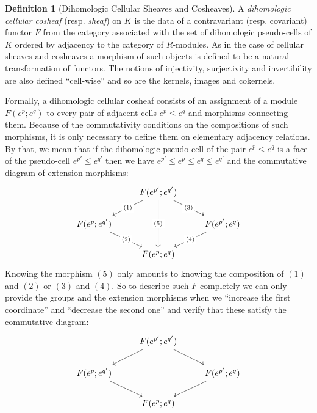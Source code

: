 \documentclass[10pt]{amsart}
\theoremstyle{definition}
\newtheorem{defi}[theo]{Definition}
\numberwithin{equation}{section}
\numberwithin{figure}{section}
\begin{document}
\begin{defi}[Dihomologic Cellular Sheaves and Cosheaves]\label{definition:dih_cosheaves}
A \emph{dihomologic cellular cosheaf} (resp. \emph{sheaf}) on $K$ is the data of a contravariant (resp. covariant) functor $F$ from the category associated with the set of dihomologic pseudo-cells of $K$ ordered by adjacency to the category of $R$-modules. As in the case of cellular sheaves and cosheaves a morphism of such objects is defined to be a natural transformation of functors. The notions of injectivity, surjectivity and invertibility are also defined ``cell-wise'' and so are the kernels, images and cokernels.


Formally, a dihomologic cellular cosheaf consists of an assignment of a module $F(e^p;e^q)$ to every pair of adjacent cells $e^p\leq e^q$ and morphisms connecting them. Because of the commutativity conditions on the compositions of such morphisms, it is only necessary to define them on elementary adjacency relations. By that, we mean that if the dihomologic pseudo-cell of the pair $e^p\leq e^q$ is a face of the pseudo-cell $e^{p'}\leq e^{q'}$ then we have $e^{p'}\leq e^{p}\leq e^{q}\leq e^{q'}$ and the commutative diagram of extension morphisms:
\begin{equation*}
\begin{tikzcd}
& F(e^{p'};e^{q'}) \ar[dd, "(5)" description] \ar[dr,"(3)" description] \ar[dl,"(1)" description] & \\
F(e^{p};e^{q'}) \ar[dr,"(2)" description] & & F(e^{p'};e^{q}) \ar[dl,"(4)" description] \\
& F(e^{p};e^{q}) &
\end{tikzcd}
\end{equation*}
Knowing the morphism $(5)$ only amounts to knowing the composition of $(1)$ and $(2)$ or $(3)$ and $(4)$. So to describe such $F$ completely we can only provide the groups and the extension morphisms when we ``increase the first coordinate'' and ``decrease the second one'' and verify that these satisfy the commutative diagram:
\begin{equation*}
\begin{tikzcd}
& F(e^{p'};e^{q'}) \ar[dr] \ar[dl] & \\
F(e^{p};e^{q'}) \ar[dr] & & F(e^{p'};e^{q}) \ar[dl] \\
& F(e^{p};e^{q}) &
\end{tikzcd}
\end{equation*}
\end{defi}
\end{document}
